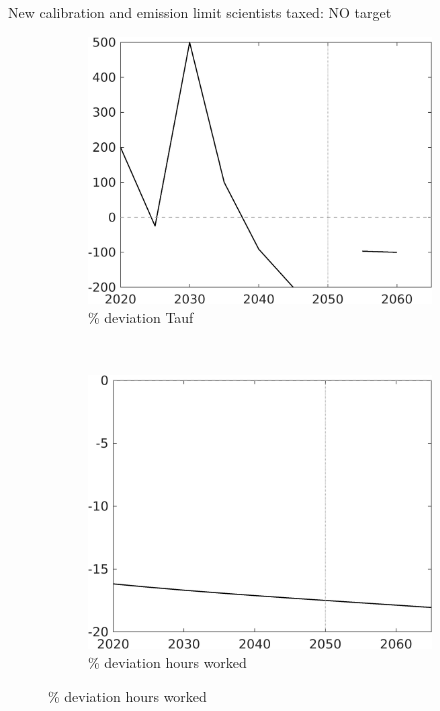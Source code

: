 \documentclass[11pt,aspectratio=169]{beamer}
\begin{document}
\begin{frame}{New calibration and emission limit scientists taxed: NO target}
	\begin{figure}[h!!]
		\centering
		\begin{subfigure}{0.4\textwidth}		
			\caption{{\% deviation  Tauf}}
			\includegraphics[width=1\textwidth]{../codding_model/own_basedOnFried/optimalPol_010922_revision/figures/all_13Sept22/Tauf_COMPtaulPerNewCalib_NoT_regime4_emnet1_Sun2_spillover0_knspil3_noskill0_sep0_xgrowth0_PV1_etaa0.79.png}
		\end{subfigure}
		\begin{minipage}[]{0.1\textwidth}
			\
		\end{minipage}
		\begin{subfigure}{0.4\textwidth}		
			\caption{{\% deviation hours worked}}
			\includegraphics[width=1\textwidth]{../codding_model/own_basedOnFried/optimalPol_010922_revision/figures/all_13Sept22/Hagg_COMPtaulPerNewCalib_NoT_regime4_emnet1_Sun2_spillover0_knspil3_noskill0_sep0_xgrowth0_PV1_etaa0.79.png}

\end{subfigure}
\end{figure}
\end{frame}
\end{document}
